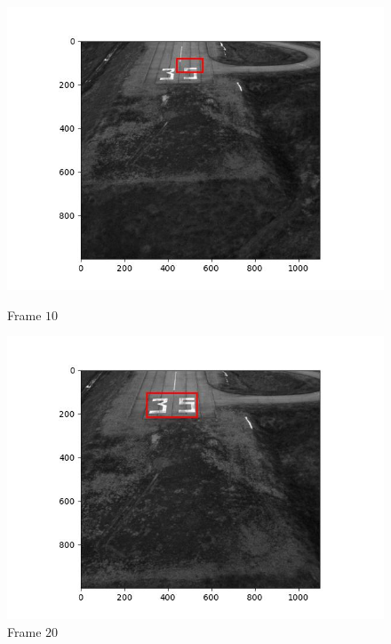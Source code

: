 \begin{figure}[H]
\begin{minipage}{.49\textwidth}
    \includegraphics[width=\textwidth]{./figures/ic_affine/landing/frame000040.jpg}
    \caption{Frame $10$}
  \end{minipage}
  \hfill
  \begin{minipage}{.49\textwidth}
    \centering
    \includegraphics[width=\textwidth]{./figures/ic_affine/landing/frame000049.jpg}
    \caption{Frame $20$}
  \end{minipage}
\end{figure}


